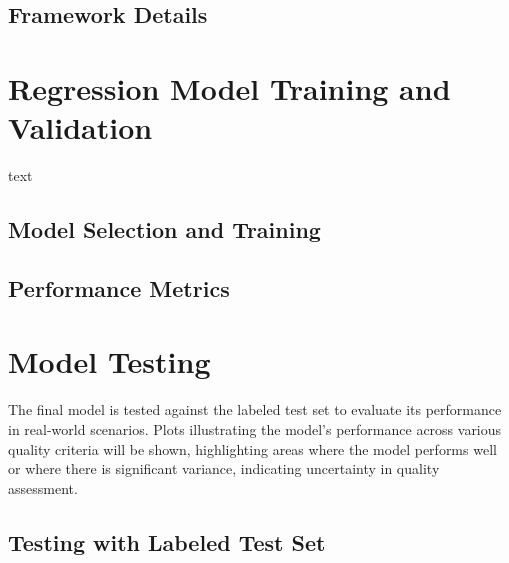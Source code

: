 \subsection{Framework Details}
\label{sub:FrameworkDetails}


\section{Regression Model Training and Validation}
\label{sec:ModelTrainVal}
text \par
\vspace{\baselineskip}
\noindent

\subsection{Model Selection and Training}
\label{sub:ModelTraining}

\subsection{Performance Metrics}
\label{sub:PerfMetrics}


\section{Model Testing}
\label{sec:ModelTesting}
The final model is tested against the labeled test set to evaluate its performance in real-world scenarios. Plots illustrating the model’s performance across various quality criteria will be shown, highlighting areas where the model performs well or where there is significant variance, indicating uncertainty in quality assessment. \par
\vspace{\baselineskip}
\noindent

\subsection{Testing with Labeled Test Set}
\label{sub:TestLabeledSet}